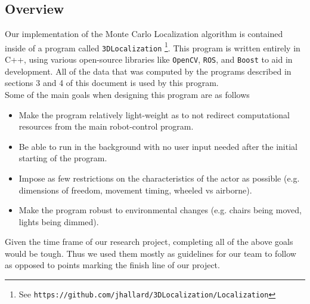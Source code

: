 \documentclass[a4paper,11pt]{article}
\begin{document}
 \subsection{Overview}
 Our implementation of the Monte Carlo Localization algorithm is contained inside of a program called \texttt{3DLocalization} \footnote{See \texttt{https://github.com/jhallard/3DLocalization/Localization}}. This program is written entirely in C++, using various open-source libraries like \texttt{OpenCV}, \texttt{ROS}, and \texttt{Boost} to aid in development. All of the data that was computed by the programs described in sections 3 and 4 of this document is used by this program. \\
 Some of the main goals when designing this program are as follows 
 \begin{itemize}
 \item Make the program relatively light-weight as to not redirect computational resources from the main robot-control program.
 \item Be able to run in the background with no user input needed after the initial starting of the program. 
 \item Impose as few restrictions on the characteristics of the actor as possible (e.g. dimensions of freedom, movement timing, wheeled vs airborne).
 \item Make the program robust to environmental changes (e.g. chairs being moved, lights being dimmed).
 \end{itemize}
  Given the time frame of our research project, completing all of the above goals would be tough. Thus we used them mostly as guidelines for our team to follow as opposed to points marking the finish line of our project.
 
\end{document}

